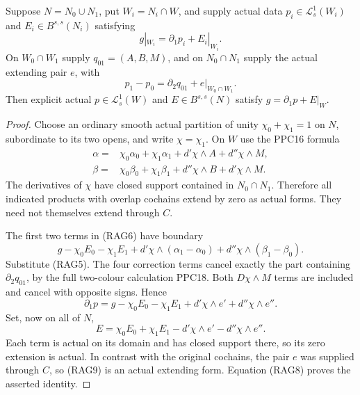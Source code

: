 \begin{theorem}
\label{thm:r9-relative-aeppli-two-open-gluing}
Suppose $N=N_0\cup N_1$, put $W_i=N_i\cap W$, and supply
actual data $p_i\in\mathcal L^1_s(W_i)$ and
$E_i\in B^{s,s}(N_i)$ satisfying
\[
                         g|_{W_i}=\partial_1p_i+E_i|_{W_i}.
 \tag{RAG4}
\]
On $W_0\cap W_1$ supply $q_{01}=(A,B,M)$, and on
$N_0\cap N_1$ supply the actual extending pair $e$, with
\[
                     p_1-p_0=\partial_2q_{01}+e|_{W_0\cap W_1}.
 \tag{RAG5}
\]
Then explicit actual $p\in\mathcal L^1_s(W)$ and
$E\in B^{s,s}(N)$ satisfy $g=\partial_1p+E|_W$.
\end{theorem}

\begin{proof}
Choose an ordinary smooth actual partition of unity
$\chi_0+\chi_1=1$ on $N$, subordinate to its two opens,
and write $\chi=\chi_1$.  On $W$ use the PPC16 formula
\[
 \begin{split}
 \alpha={}&\chi_0\alpha_0+\chi_1\alpha_1
                                  +d'\chi\wedge A+d''\chi\wedge M,\\
 \beta={}&\chi_0\beta_0+\chi_1\beta_1
                                  +d''\chi\wedge B+d'\chi\wedge M.
 \end{split}
 \tag{RAG6}
\]
The derivatives of $\chi$ have closed support contained
in $N_0\cap N_1$.  Therefore all indicated products with
overlap cochains extend by zero as actual forms.  They
need not themselves extend through $C$.

The first two terms in (RAG6) have boundary
\[
       g-\chi_0E_0-\chi_1E_1
          +d'\chi\wedge(\alpha_1-\alpha_0)
          +d''\chi\wedge(\beta_1-\beta_0).
 \tag{RAG7}
\]
Substitute (RAG5).  The four correction terms cancel
exactly the part containing $\partial_2q_{01}$, by
the full two-colour calculation PPC18.  Both
$D\chi\wedge M$ terms are included and cancel with
opposite signs.  Hence
\[
             \partial_1p=g-\chi_0E_0-\chi_1E_1
                              +d'\chi\wedge e'+d''\chi\wedge e''.
 \tag{RAG8}
\]
Set, now on all of $N$,
\[
                 E=\chi_0E_0+\chi_1E_1
                              -d'\chi\wedge e'-d''\chi\wedge e''.
 \tag{RAG9}
\]
Each term is actual on its domain and has closed support
there, so its zero extension is actual.  In contrast with
the original cochains, the pair $e$ was supplied through
$C$, so (RAG9) is an actual extending form.  Equation
(RAG8) proves the asserted identity.
\end{proof}

